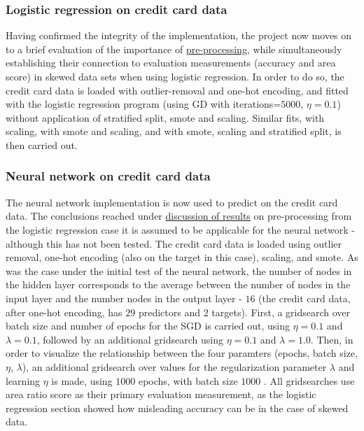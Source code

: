 \documentclass[%
oneside,                 %
final,                   %
10pt]{article}
\begin{document}
\subsubsection{Logistic regression on credit card data}
Having confirmed the integrity of the implementation, the project now moves on to a brief evaluation of the importance of \hyperref[Section_M_PP]{pre-processing}, while simultaneously establishing their connection to evaluation measurements (accuracy and area score) in skewed data sets when using logistic regression. In order to do so, the credit card data is loaded with outlier-removal and one-hot encoding, and fitted with the logistic regression program (using GD with iterations=$5000$, $\eta=0.1$) without application of stratified split, smote and scaling. Similar fits, with scaling, with smote and scaling, and with smote, scaling and stratified split, is then carried out.

\subsubsection{Neural network on credit card data}
The neural network implementation is now used to predict on the credit card data. The conclusions reached under \hyperref[Section_Discussion_of_results]{discussion of results} on pre-processing from the logistic regression case it is assumed to be applicable for the neural network - although this has not been tested. The credit card data is loaded using outlier removal, one-hot encoding (also on the target in this case), scaling,  and smote. As was the case under the initial test of the neural network, the number of nodes in the hidden layer corresponds to the average between the number of nodes in the input layer and the number nodes in the output layer - $16$ (the credit card data, after one-hot encoding, has $29$ predictors and $2$ targets). First, a gridsearch over batch size and number of epochs for the SGD is carried out, using $\eta=0.1$ and $\lambda=0.1$, followed by an additional gridsearch using $\eta=0.1$ and $\lambda=1.0$. Then, in order to visualize the relationship between the four paramters (epochs, batch size, $\eta$, $\lambda$), an additional gridsearch over values for the regularization parameter $\lambda$ and learning $\eta$ is made, using $1000$ epochs, with batch size $1000$ . All gridsearches use area ratio score as their primary evaluation measurement, as the logistic regression section showed how misleading accuracy can be in the case of skewed data.
\end{document}

